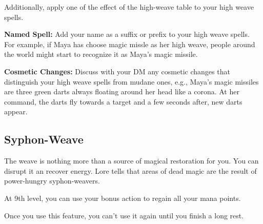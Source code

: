 \begin{multicols*}{2}
Additionally, apply one of the effect of the high-weave table to your high weave spells.


\textbf{Named Spell:} Add your name as a suffix or prefix to your high weave spells. For example, if Maya has choose 
magic missle as her high weave, people around the world might start to recognize it as Maya's magic missile. 


\textbf{Cosmetic Changes:} Discuss with your DM any cosmetic changes that distinguish your high weave spells from mudane ones, e.g., Maya's magic missiles are three green darts always floating around her head like a corona. At her command, the darts fly towards a target and a few seconds after, new darts appear.



\subsection*{Syphon-Weave}

The weave is nothing more than a source of magical restoration for you. You can disrupt it an recover energy. Lore tells that areas of dead magic are the result of power-hungry syphon-weavers.

At 9th level, you can use your bonus action to regain all your mana points. 

Once you use this feature, you can’t use it again until you finish a long rest.





\end{multicols*}

